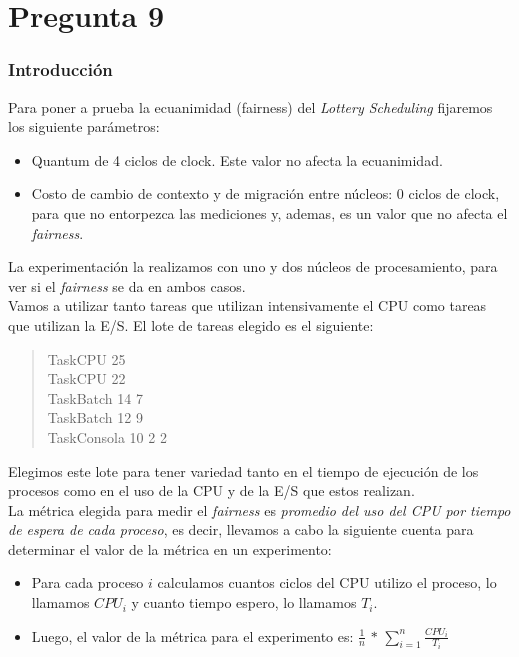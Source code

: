 \section{Pregunta 9}



\subsubsection{Introducción}

Para poner a prueba la ecuanimidad (fairness) del \textit{Lottery Scheduling} fijaremos los siguiente parámetros:
\begin{itemize}
	\item Quantum de 4 ciclos de clock. Este valor no afecta la ecuanimidad.
	\item Costo de cambio de contexto y de migración entre núcleos: 0 ciclos de clock, para que no entorpezca las mediciones y, ademas, es un valor que no afecta el \textit{fairness}.
\end{itemize}

La experimentación la realizamos con uno y dos núcleos de procesamiento, para ver si el \textit{fairness} se da en ambos casos.\\


Vamos a utilizar tanto tareas que utilizan intensivamente el CPU como tareas que utilizan la E/S. El lote de tareas elegido es el siguiente:
\begin{quote}
TaskCPU 25\\
TaskCPU 22\\
TaskBatch 14 7\\
TaskBatch 12 9\\
TaskConsola 10 2 2\\
\end{quote}

Elegimos este lote para tener variedad tanto en el tiempo de ejecución de los procesos como en el uso de la CPU y de la E/S que estos realizan.\\


La métrica elegida para medir el \textit{fairness} es \textit{promedio del uso del CPU por tiempo de espera de cada proceso}, es decir, llevamos a cabo la siguiente cuenta para determinar el valor de la métrica en un experimento:
\begin{itemize}
	\item Para cada proceso $i$ calculamos cuantos ciclos del CPU utilizo el proceso, lo llamamos $CPU_i$ y cuanto tiempo espero, lo llamamos $T_i$.
	\item Luego, el valor de la métrica para el experimento es: $\frac{1}{n}$ $*$ $\sum_{i = 1}^{n} \frac{CPU_i}{T_i}$
\end{itemize}



